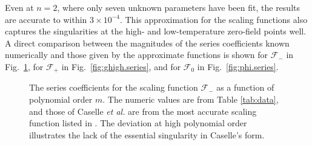 \documentclass[
aps,
pre,
preprint,
longbibliography,
floatfix
]{revtex4-2}
\begin{document}
Even at $n=2$, where only seven unknown parameters have been fit, the results
are accurate to within $3\times10^{-4}$. This approximation for the scaling
functions also captures the singularities at the high- and low-temperature
zero-field points well. A direct comparison between the magnitudes of the
series coefficients known numerically and those given by the approximate
functions is shown for $\mathcal F_-$ in Fig.~\ref{fig:glow.series}, for
$\mathcal F_+$ in Fig.~\ref{fig:ghigh.series}, and for $\mathcal F_0$ in
Fig.~\ref{fig:phi.series}.

\begin{figure}
  \caption{
    The series coefficients for the scaling function $\mathcal F_-$ as a
    function of polynomial order $m$. The numeric values are from Table
    \ref{tab:data}, and those of Caselle \textit{et al.} are from the most
    accurate scaling function listed in \cite{Caselle_2001_The}. The deviation at high polynomial order illustrates the lack of the essential singularity in Caselle's form.
  } \label{fig:glow.series}
\end{figure}
\end{document}
